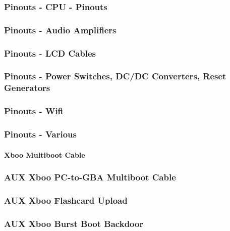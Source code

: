\documentclass[11pt,a4paper]{proc}
\begin{document}
\begin{flushleft}
\subsubsection{Pinouts - CPU - Pinouts}

\subsubsection{Pinouts - Audio Amplifiers}

\subsubsection{Pinouts - LCD Cables}

\subsubsection{Pinouts - Power Switches, DC/DC Converters, Reset Generators}

\subsubsection{Pinouts - Wifi}

\subsubsection{Pinouts - Various}

\paragraph{Xboo Multiboot Cable}

\subsubsection{AUX Xboo PC-to-GBA Multiboot Cable}

\subsubsection{AUX Xboo Flashcard Upload}

\subsubsection{AUX Xboo Burst Boot Backdoor}

\end{flushleft}
\end{document}

